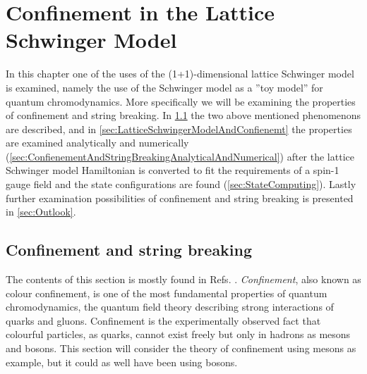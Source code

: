 \documentclass[../main.tex]{subfiles} %
\begin{document}
\chapter{Confinement in the Lattice Schwinger Model} \label{chap:Confinement}


In this chapter one of the uses of the (1+1)-dimensional lattice Schwinger model is examined, namely the use of the Schwinger model as a ''toy model'' for quantum chromodynamics. More specifically we will be examining the properties of confinement and string breaking. In \cref{sec:Confinement} the two above mentioned phenomenons are described, and in \cref{sec:LatticeSchwingerModelAndConfienemt} the properties are examined analytically and numerically (\cref{sec:ConfienementAndStringBreakingAnalyticalAndNumerical}) after the lattice Schwinger model Hamiltonian is converted to fit the requirements of a spin-1 gauge field and the state configurations are found (\cref{sec:StateComputing}). Lastly further examination possibilities of confinement and string breaking is presented in \cref{sec:Outlook}.




\section{Confinement and string breaking} \label{sec:Confinement}

The contents of this section is mostly found in Refs. \cite{smit_introToQuantumFieldsOnALattice_2003, griffiths_introToElementaryParticles_2008}. \emph{Confinement}, also known as colour confinement, is one of the most fundamental properties of quantum chromodynamics, the quantum field theory describing strong interactions of quarks and gluons. Confinement is the experimentally observed fact that colourful particles, as quarks, cannot exist freely but only in hadrons as mesons and bosons. This section will consider the theory of confinement using mesons as example, but it could as well have been using bosons.
\end{document}
